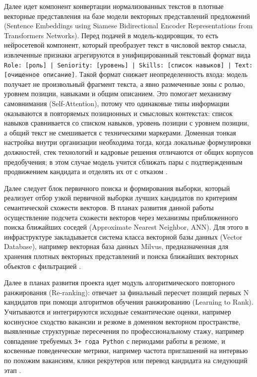 \begin{compactenum}
  \item Далее идет компонент конвертации нормализованных текстов в плотные векторные представления на базе модели векторных представлений предложений (Sentence Embeddings using Siamese Bidirectional Encoder Representations from Transformers Networks). Перед подачей в модель-кодировщик, то есть нейросетевой компонент, который преобразует текст в числовой вектор смысла, извлеченные признаки агрегируются в унифицированный текстовый формат вида \texttt{Role: {[}роль{]} | Seniority: {[}уровень{]} | Skills: {[}список навыков{]} | Text: {[}очищенное описание{]}}. Такой формат снижает неопределенность входа: модель получает не произвольный фрагмент текста, а явно размеченные зоны с ролью, уровнем позиции, навыками и общим описанием. Это помогает механизму самовнимания (Self-Attention), потому что одинаковые типы информации оказываются в повторяемых позиционных и смысловых контекстах: список навыков сравнивается со списком навыков, уровень позиции с уровнем позиции, а общий текст не смешивается с техническими маркерами. Доменная тонкая настройка внутри организации необходима тогда, когда локальные формулировки должностей, стек технологий и кадровые решения отличаются от общих корпусов предобучения; в этом случае модель учится сближать пары с подтвержденным продвижением кандидата и отделять их от с отказом \cite{src01, src06, src24}.

  \item Далее следует блок первичного поиска и формирования выборки, который реализует отбор узкой первичной выборки лучших кандидатов по критериям семантической схожести векторов. В планах развития данной работы осуществление подсчета схожести векторов через механизмы приближенного поиска ближайших соседей (Approximate Nearest Neighbor, ANN). Для этого в инфраструктуре закладывается система класса векторной базы данных (Vector Database), например векторная база данных Milvus, предназначенная для хранения плотных векторных представлений и поиска ближайших векторных объектов с фильтрацией \cite{src12}.

  \item Далее в планах развития проекта идет модуль алгоритмического повторного ранжирования (Re-ranking): отвечает за финальный пересчет позиций первых N кандидатов при помощи алгоритмов обучения ранжированию (Learning to Rank). Учитываются и интегрируются исходные семантические оценки, например косинусное сходство вакансии и резюме в доменном векторном пространстве, выявленные структурные пересечения по профессиональному стажу, например совпадение требуемых \texttt{3+ года Python} с периодами работы в резюме, и косвенные поведенческие метрики, например частота приглашений на интервью по похожим вакансиям, клики рекрутеров или перевод кандидата на следующий этап \cite{src17, src38, src43, src44, src45}.


\end{compactenum}
